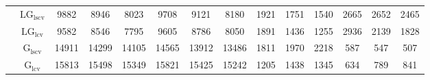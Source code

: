 \begin{table}[!ht]
{\begin{tabular}{@{}cc|ccc|ccc|ccc|ccc@{}}
 & $\mathrm{LG}_{\mathrm{lscv}}$ & 9882 & 8946 & 8023 & 9708 & 9121 & 8180 & 1921 & 1751 & 1540 & 2665 & 2652 & 2465 \\ 
 & $\mathrm{LG}_{\mathrm{lcv}}$ & 9582 & 8546 & 7795 & 9605 & 8786 & 8050 & 1891 & 1436 & 1255 & 2936 & 2139 & 1828 \\ 
 & $\mathrm{G}_{\mathrm{lscv}}$ & 14911 & 14299 & 14105 & 14565 & 13912 & 13486 & 1811 & 1970 & 2218 & \cellcolor{black!30}587 & \cellcolor{black!30}547 & \cellcolor{black!30}507 \\ 
 & $\mathrm{G}_{\mathrm{lcv}}$ & 15813 & 15498 & 15349 & 15821 & 15425 & 15242 & \cellcolor{black!30}1205 & 1438 & 1345 & \cellcolor{black!10}634 & \cellcolor{black!10}789 & \cellcolor{black!10}841 \\ 
\bottomrule
\end{tabular}}
\end{table}

